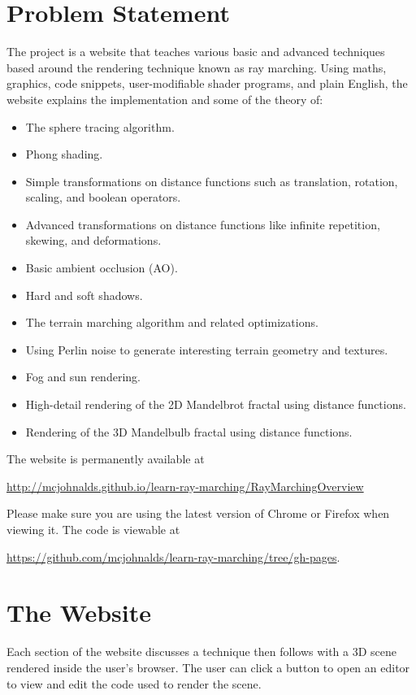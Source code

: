 \documentclass[parskip=half]{scrartcl}
\begin{document}
\section{Problem Statement}

The project is a website that teaches various basic and advanced techniques
based around the rendering technique known as ray marching. Using maths,
graphics, code snippets, user-modifiable shader programs, and plain English,
the website explains the implementation and some of the theory of:
\begin{itemize}
    \item The sphere tracing algorithm.
    \item Phong shading.
    \item Simple transformations on distance functions such as translation,
        rotation, scaling, and boolean operators.
    \item Advanced transformations on distance functions like infinite
        repetition, skewing, and deformations.
    \item Basic ambient occlusion (AO).
    \item Hard and soft shadows.
    \item The terrain marching algorithm and related optimizations.
    \item Using Perlin noise to generate interesting terrain geometry and
        textures.
    \item Fog and sun rendering.
    \item High-detail rendering of the 2D Mandelbrot fractal using distance
        functions.
    \item Rendering of the 3D Mandelbulb fractal using distance functions.
\end{itemize}

The website is permanently available at

\qquad\url{http://mcjohnalds.github.io/learn-ray-marching/RayMarchingOverview}

Please make sure you are using the latest version of Chrome or Firefox when
viewing it. The code is viewable at

\qquad\url{https://github.com/mcjohnalds/learn-ray-marching/tree/gh-pages}.

\section{The Website}

Each section of the website discusses a technique then follows with a 3D scene
rendered inside the user's browser. The user can click a button to open an
editor to view and edit the code used to render the scene.
\end{document}
